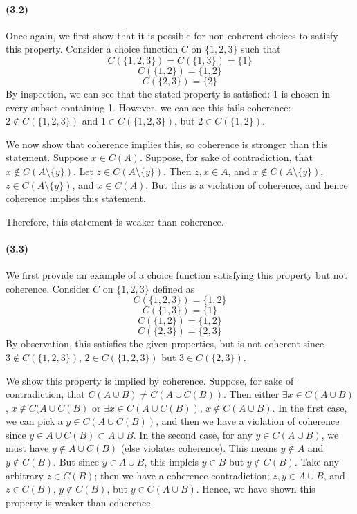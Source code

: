 \documentclass[10pt,letter]{article}
\begin{document}
\paragraph{(3.2)}
Once again, we first show that it is possible for non-coherent choices to satisfy this property. Consider a choice function $C$ on $\{ 1, 2, 3 \}$ such that
\[ C(\{ 1, 2, 3 \}) = C(\{ 1, 3 \}) = \{ 1 \} \]
\[ C(\{ 1, 2 \}) = \{ 1, 2 \} \]
\[ C(\{ 2, 3 \}) = \{ 2\} \]
By inspection, we can see that the stated property is satisfied: 1 is chosen in every subset containing 1. However, we can see this fails coherence: $2 \not \in C(\{ 1, 2, 3\})$ and $1 \in C(\{ 1, 2, 3\})$, but $2 \in C(\{ 1, 2 \})$.

We now show that coherence implies this, so coherence is stronger than this statement. Suppose $x \in C(A)$. Suppose, for sake of contradiction, that $x \not \in C(A \setminus \{ y \})$. Let $z \in C(A \setminus \{ y \})$. Then $z,x \in A$, and $x \not\in C(A \setminus \{ y \})$, $z \in C(A \setminus \{ y \})$, and $x \in C(A)$. But this is a violation of coherence, and hence coherence implies this statement.

Therefore, this statement is weaker than coherence.
\paragraph{(3.3)}
We first provide an example of a choice function satisfying this property but not coherence. Consider $C$ on $\{ 1, 2, 3 \}$ defined as
\[ C(\{ 1, 2, 3 \}) = \{ 1, 2 \} \]
\[ C(\{ 1, 3 \}) = \{ 1 \} \]
\[ C(\{ 1, 2 \}) = \{ 1, 2 \} \]
\[ C(\{ 2, 3 \}) = \{ 2, 3 \} \]
By observation, this satisfies the given properties, but is not coherent since $3 \not \in C(\{ 1, 2, 3\})$, $2 \in C(\{ 1, 2, 3 \})$ but $3 \in C(\{ 2 , 3 \})$.

We show this property is implied by coherence. Suppose, for sake of contradiction, that $C(A \cup B) \neq C(A \cup C(B))$. Then either $\exists x \in C(A \cup B)$, $x \not \in C(A \cup C(B)$ or $\exists x \in C(A \cup C(B))$, $x \not \in C(A \cup B)$. In the first case, we can pick a $y \in C(A \cup C(B))$, and then we have a violation of coherence since $y \in A \cup C(B) \subset A \cup B$. In the second case, for any $y \in C(A \cup B)$, we must have $y \not \in A \cup C(B)$ (else violates coherence). This means $y \not \in A$ and $y \not \in C(B)$. But since $y \in A \cup B$, this impleis $y \in B$ but $y \not \in C(B)$. Take any arbitrary $z \in C(B)$; then we have a coherence contradiction; $z, y \in A \cup B$, and $z \in C(B)$, $y \not \in C(B)$, but $y \in C(A \cup B)$. Hence, we have shown this property is weaker than coherence.
\end{document}
